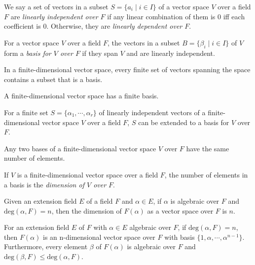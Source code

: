 \begin{definition}
    We say a set of vectors in a subset $S = \{a_i \mid i \in I\}$ of a vector space $V$ over a field $F$ are \emph{linearly independent over $F$} if any linear combination of them is 0 iff each coefficient is 0. Otherwise, they are \emph{linearly dependent over $F$}.
\end{definition}
\begin{definition}[Basis]
    For a vector space $V$ over a field $F$, the vectors in a subset $B = \{\beta_i \mid i \in I\}$ of $V$ form a \emph{basis for $V$ over $F$} if they span $V$ and are linearly independent.  
\end{definition}
\begin{theorem}
    In a finite-dimensional vector space, every finite set of vectors spanning the space contains a subset that is a basis.
\end{theorem}
\begin{corollary}
    A finite-dimensional vector space has a finite basis.
\end{corollary}
\begin{theorem}
    For a finite set $S = \{\alpha_1, \cdots, \alpha_r\}$ of linearly independent vectors of a finite-dimensional vector space $V$ over a field $F$, $S$ can be extended to a basis for $V$ over $F$. 
\end{theorem}
\begin{corollary}
    Any two bases of a finite-dimensional vector space $V$ over $F$ have the same number of elements.
\end{corollary}
\begin{definition}
    If $V$ is a finite-dimensional vector space over a field $F$, the number of elements in a basis is the \emph{dimension of $V$ over $F$}.
\end{definition}
\begin{example}
    Given an extension field $E$ of a field $F$ and $\alpha \in E$, if $\alpha$ is algebraic over $F$ and $\text{deg}(\alpha, F) = n$, then the dimension of $F(\alpha)$ as a vector space over $F$ is $n$.
\end{example}
\begin{theorem}
    For an extension field $E$ of $F$ with $\alpha \in E$ algebraic over $F$, if $\text{deg}(\alpha, F) = n$, then $F(\alpha)$ is an n-dimensional vector space over $F$ with basis $\{1, \alpha, \cdots, \alpha^{n-1}\}$. Furthermore, every element $\beta$ of $F(\alpha)$ is algebraic over $F$ and $\text{deg}(\beta, F) \leq \text{deg}(\alpha, F)$.
\end{theorem}

